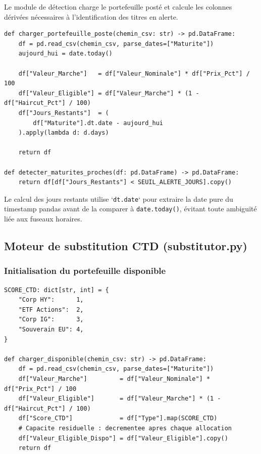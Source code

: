 \documentclass[12pt,a4paper]{article}
\begin{document}
Le module de détection charge le portefeuille posté et calcule les colonnes dérivées
nécessaires à l'identification des titres en alerte.

\begin{lstlisting}[caption={Calcul des jours restants et filtrage des alertes}]
def charger_portefeuille_poste(chemin_csv: str) -> pd.DataFrame:
    df = pd.read_csv(chemin_csv, parse_dates=["Maturite"])
    aujourd_hui = date.today()

    df["Valeur_Marche"]   = df["Valeur_Nominale"] * df["Prix_Pct"] / 100
    df["Valeur_Eligible"] = df["Valeur_Marche"] * (1 - df["Haircut_Pct"] / 100)
    df["Jours_Restants"]  = (
        df["Maturite"].dt.date - aujourd_hui
    ).apply(lambda d: d.days)

    return df

def detecter_maturites_proches(df: pd.DataFrame) -> pd.DataFrame:
    return df[df["Jours_Restants"] < SEUIL_ALERTE_JOURS].copy()
\end{lstlisting}

Le calcul des jours restants utilise `\texttt{dt.date}` pour extraire la date pure
du timestamp pandas avant de la comparer à \texttt{date.today()}, évitant toute
ambiguïté liée aux fuseaux horaires.

\subsection{Moteur de substitution CTD (substitutor.py)}

\subsubsection{Initialisation du portefeuille disponible}

\begin{lstlisting}[caption={Chargement et initialisation de la capacité résiduelle}]
SCORE_CTD: dict[str, int] = {
    "Corp HY":      1,
    "ETF Actions":  2,
    "Corp IG":      3,
    "Souverain EU": 4,
}

def charger_disponible(chemin_csv: str) -> pd.DataFrame:
    df = pd.read_csv(chemin_csv, parse_dates=["Maturite"])
    df["Valeur_Marche"]         = df["Valeur_Nominale"] * df["Prix_Pct"] / 100
    df["Valeur_Eligible"]       = df["Valeur_Marche"] * (1 - df["Haircut_Pct"] / 100)
    df["Score_CTD"]             = df["Type"].map(SCORE_CTD)
    # Capacite residuelle : decrementee apres chaque allocation
    df["Valeur_Eligible_Dispo"] = df["Valeur_Eligible"].copy()
    return df
\end{lstlisting}
\end{document}
